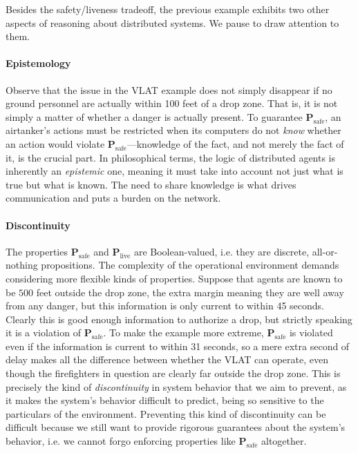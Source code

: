 \documentclass[]             %
{NASA}                       %
\theoremstyle{definition}
\begin{document}
Besides the safety/liveness tradeoff, the previous example exhibits
two other aspects of reasoning about distributed systems. We pause to
draw attention to them.

\paragraph{Epistemology}
Observe that the issue in the VLAT example does not simply disappear
if no ground personnel are actually within 100 feet of a drop
zone. That is, it is not simply a matter of whether a danger is
actually present. To guarantee \(\textbf{P}_\textrm{safe}\), an
airtanker's actions must be restricted when its computers do not
\emph{know} whether an action would violate
\(\textbf{P}_\textrm{safe}\)---knowledge of the fact, and not merely
the fact of it, is the crucial part. In philosophical terms, the logic
of distributed agents is inherently an \emph{epistemic} one,
meaning it must take into account not just what is true but what is
known. The need to share knowledge is what drives communication and
puts a burden on the network.

\paragraph{Discontinuity}
The properties $\mathbf{P}_\textrm{safe}$ and
$\mathbf{P}_\textrm{live}$ are Boolean-valued, i.e. they are discrete,
all-or-nothing propositions. The complexity of the operational
environment demands considering more flexible kinds of
properties. Suppose that agents are known to be $500$ feet outside the
drop zone, the extra margin meaning they are well away from any
danger, but this information is only current to within 45
seconds. Clearly this is good enough information to authorize a drop,
but strictly speaking it is a violation of
$\mathbf{P}_\textrm{safe}$. To make the example more extreme,
$\mathbf{P}_\textrm{safe}$ is violated even if the information is
current to within 31 seconds, so a mere extra second of delay makes
all the difference between whether the VLAT can operate, even though
the firefighters in question are clearly far outside the drop
zone. This is precisely the kind of \emph{discontinuity} in system
behavior that we aim to prevent, as it makes the system's behavior
difficult to predict, being so sensitive to the particulars of the
environment. Preventing this kind of discontinuity can be difficult
because we still want to provide rigorous guarantees about the
system's behavior, i.e. we cannot forgo enforcing properties like
$\mathbf{P}_\textrm{safe}$ altogether.
\end{document}
